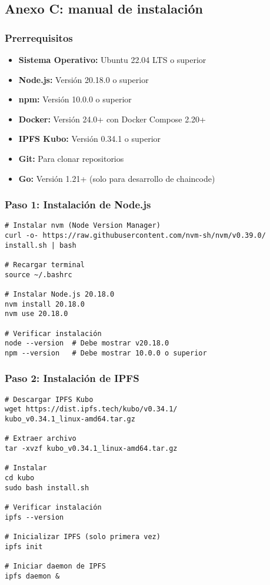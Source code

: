 \subsection{Anexo C: manual de instalación}

\subsubsection{Prerrequisitos}

\begin{itemize}
    \item \textbf{Sistema Operativo:} Ubuntu 22.04 LTS o superior
    \item \textbf{Node.js:} Versión 20.18.0 o superior
    \item \textbf{npm:} Versión 10.0.0 o superior
    \item \textbf{Docker:} Versión 24.0+ con Docker Compose 2.20+
    \item \textbf{IPFS Kubo:} Versión 0.34.1 o superior
    \item \textbf{Git:} Para clonar repositorios
    \item \textbf{Go:} Versión 1.21+ (solo para desarrollo de chaincode)
\end{itemize}

\subsubsection{Paso 1: Instalación de Node.js}

\begin{verbatim}
# Instalar nvm (Node Version Manager)
curl -o- https://raw.githubusercontent.com/nvm-sh/nvm/v0.39.0/
install.sh | bash

# Recargar terminal
source ~/.bashrc

# Instalar Node.js 20.18.0
nvm install 20.18.0
nvm use 20.18.0

# Verificar instalación
node --version  # Debe mostrar v20.18.0
npm --version   # Debe mostrar 10.0.0 o superior
\end{verbatim}

\subsubsection{Paso 2: Instalación de IPFS}

\begin{verbatim}
# Descargar IPFS Kubo
wget https://dist.ipfs.tech/kubo/v0.34.1/
kubo_v0.34.1_linux-amd64.tar.gz

# Extraer archivo
tar -xvzf kubo_v0.34.1_linux-amd64.tar.gz

# Instalar
cd kubo
sudo bash install.sh

# Verificar instalación
ipfs --version

# Inicializar IPFS (solo primera vez)
ipfs init

# Iniciar daemon de IPFS
ipfs daemon &
\end{verbatim}

